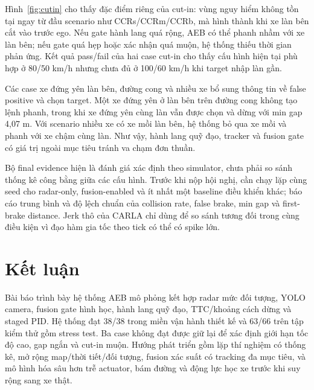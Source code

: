 \documentclass[conference]{IEEEtran}
\begin{document}
Hình~\ref{fig:cutin} cho thấy đặc điểm riêng của cut-in: vùng nguy hiểm không tồn tại ngay từ đầu scenario như CCRs/CCRm/CCRb, mà hình thành khi xe làn bên cắt vào trước ego. Nếu gate hành lang quá rộng, AEB có thể phanh nhầm với xe làn bên; nếu gate quá hẹp hoặc xác nhận quá muộn, hệ thống thiếu thời gian phản ứng. Kết quả pass/fail của hai case cut-in cho thấy cấu hình hiện tại phù hợp ở 80/50 km/h nhưng chưa đủ ở 100/60 km/h khi target nhập làn gần.

Các case xe đứng yên làn bên, đường cong và nhiều xe bổ sung thông tin về false positive và chọn target. Một xe đứng yên ở làn bên trên đường cong không tạo lệnh phanh, trong khi xe đứng yên cùng làn vẫn được chọn và dừng với min gap 4,07 m. Với scenario nhiều xe có xe mồi làn bên, hệ thống bỏ qua xe mồi và phanh với xe chậm cùng làn. Như vậy, hành lang quỹ đạo, tracker và fusion gate có giá trị ngoài mục tiêu tránh va chạm đơn thuần.

Bộ final evidence hiện là đánh giá xác định theo simulator, chưa phải so sánh thống kê công bằng giữa các cấu hình. Trước khi nộp hội nghị, cần chạy lặp cùng seed cho radar-only, fusion-enabled và ít nhất một baseline điều khiển khác; báo cáo trung bình và độ lệch chuẩn của collision rate, false brake, min gap và first-brake distance. Jerk thô của CARLA chỉ dùng để so sánh tương đối trong cùng điều kiện vì đạo hàm gia tốc theo tick có thể có spike lớn.

\section{Kết luận}
Bài báo trình bày hệ thống AEB mô phỏng kết hợp radar mức đối tượng, YOLO camera, fusion gate hình học, hành lang quỹ đạo, TTC/khoảng cách dừng và staged PID. Hệ thống đạt 38/38 trong miền vận hành thiết kế và 63/66 trên tập kiểm thử gồm stress test. Ba case không đạt được giữ lại để xác định giới hạn tốc độ cao, gap ngắn và cut-in muộn. Hướng phát triển gồm lặp thí nghiệm có thống kê, mở rộng map/thời tiết/đối tượng, fusion xác suất có tracking đa mục tiêu, và mô hình hóa sâu hơn trễ actuator, bám đường và động lực học xe trước khi suy rộng sang xe thật.

\balance


\end{document}
